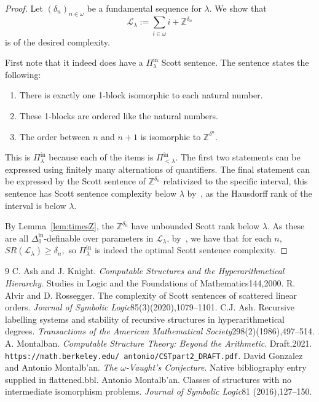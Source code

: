 \documentclass[10pt,a4paper]{amsart}
\providecommand{\tightlist}{%
  \setlength{\itemsep}{0pt}\setlength{\parskip}{0pt}}
\providecommand{\L}{\mathcal{L}}
\providecommand{\Pinf}[1]{\Pi^{\mathrm{in}}_{#1}}
\providecommand{\Dinf}[1]{\Delta^{\mathrm{in}}_{#1}}
\newcommand{\SR}{SR}
\newcommand{\Z}{\mathbb{Z}}
\renewcommand{\L}{\mathcal{L}}
\begin{document}
\begin{proof}
Let $(\delta_n)_{n\in\omega}$ be a fundamental sequence for $\lambda$. We show that
\[\L_\lambda:=\sum_{i\in\omega}i+\Z^{\delta_n}\]
is of the desired complexity. 

First note that it indeed does have a $\Pinf{\lambda}$ Scott sentence. The sentence states the following:
\begin{enumerate}\tightlist
    \item There is exactly one 1-block isomorphic to each natural number. 
    \item These 1-blocks are ordered like the natural numbers.
    \item The order between $n$ and $n+1$ is isomorphic to $\Z^{\delta^n}.$
\end{enumerate}
This is $\Pinf{\lambda}$ because each of the items is $\Pinf{<\lambda}$. 
The first two statements can be expressed using finitely many alternations of quantifiers. 
The final statement can be expressed by the Scott sentence of $\Z^{\delta_n}$
relativized to the specific interval, this sentence has Scott sentence
complexity below $\lambda$ by~\cite{AR20}, as the Hausdorff rank of the interval
is below $\lambda$. 

By Lemma~\ref{lem:timesZ}, the $\Z^{\delta_n}$ have unbounded Scott rank below $\lambda$. 
As these are all $\Dinf0$-definable over parameters in $\L_\lambda$,
by~\cite[Lemma 4.3]{MonIntermediate}, we have that for each $n$, $\SR(\L_\lambda)\geq\delta_n,$ so $\Pinf{\lambda}$ is indeed the optimal Scott sentence complexity.
\end{proof}

\begin{thebibliography}{9}
 C. Ash and J. Knight. \emph{Computable Structures and the Hyperarithmetical Hierarchy}. Studies in Logic and the Foundations of Mathematics144,2000.
 R. Alvir and D. Rossegger. The complexity of Scott sentences of scattered linear orders. \emph{Journal of Symbolic Logic}85(3)(2020),1079--1101.
 C.J. Ash. Recursive labelling systems and stability of recursive structures in hyperarithmetical degrees. \emph{Transactions of the American Mathematical Society}298(2)(1986),497--514.
 A. Montalban. \emph{Computable Structure Theory: Beyond the Arithmetic}. Draft,2021. \texttt{https://math.berkeley.edu/\string~antonio/CSTpart2\_DRAFT.pdf}.
 David Gonzalez and Antonio Montalb'an. \emph{The $\omega$-Vaught's Conjecture}. Native bibliography entry supplied in flattened.bbl.
 Antonio Montalb'an. Classes of structures with no intermediate isomorphism problems. \emph{Journal of Symbolic Logic}81 (2016),127--150.
\end{thebibliography}
\end{document}
